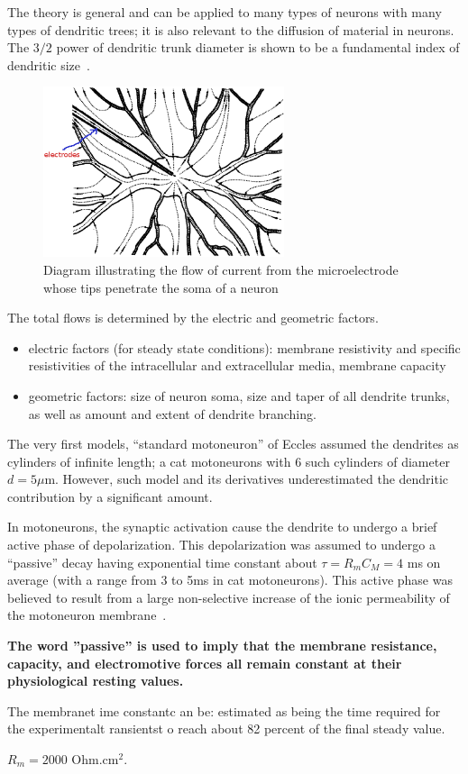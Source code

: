 The theory is general and can be applied to many types of neurons with
many types of dendritic trees; it is also relevant to the diffusion of
material in neurons. The $3/2$ power of dendritic trunk diameter is
shown to be a fundamental index of dendritic size~\citep{rall1959bdt}. 
\begin{figure}[hbt]
  \centerline{\includegraphics[height=5cm,
    angle=0]{./images/somacurrent_flow.eps}}
\caption{Diagram illustrating the flow of current from the
  microelectrode whose tips penetrate the soma of a neuron}
\label{fig:current_flow}
\end{figure}

The total flows is determined by the electric and geometric factors. 
\begin{itemize}
\item electric factors (for steady state conditions): membrane
  resistivity and specific resistivities of the intracellular and
  extracellular media, membrane capacity
\item geometric factors: size of neuron soma, size and taper of all
  dendrite trunks, as well as amount and extent of dendrite
  branching. 
\end{itemize}

The very first models, ``standard motoneuron'' of Eccles
\citep{eccles1957pnc} assumed the dendrites as cylinders of infinite
length; a cat motoneurons with 6 such cylinders of diameter
$d=5\mu$m. However, such model and its derivatives underestimated
the dendritic contribution by a significant amount.


In motoneurons, the synaptic activation cause the dendrite to undergo
a brief active phase of depolarization. This depolarization was
assumed to undergo a ``passive'' decay having exponential time
constant about $\tau = R_mC_M = 4$ ms on average (with a range from 3
to 5ms in cat motoneurons). This active phase was believed to result
from a large non-selective increase of the ionic permeability of the
motoneuron membrane~\citep{rall1960mpt}.

{\bf The word ''passive'' is used to imply that the membrane resistance,
  capacity, and electromotive forces all remain constant at their
  physiological resting values.}

The membranet ime constantc an
be: estimated as being the time required
for the experimentalt ransientst o reach
about 82 percent of the final steady
value.

$R_m=2000$ Ohm.cm$^2$.


